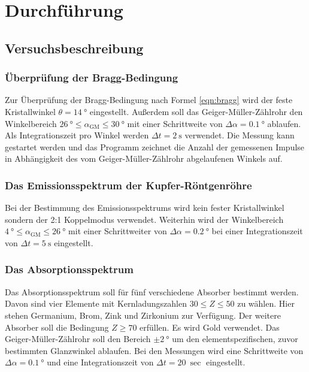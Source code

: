 \section{Durchführung}
\label{sec:Durchführung}



\FloatBarrier
\subsection{Versuchsbeschreibung}
\label{sec:Versuchsbeschreibung}

\subsubsection{Überprüfung der Bragg-Bedingung}
Zur Überprüfung der Bragg-Bedingung nach Formel \eqref{eqn:bragg} wird der feste Kristallwinkel
$\theta = \SI{14}{\degree}$ eingestellt. Außerdem soll das Geiger-Müller-Zählrohr den 
Winkelbereich $\SI{26}{\degree} \le \alpha_{\mathrm{GM}} \le \SI{30}{\degree}$ mit einer 
Schrittweite von $\Delta \alpha = \SI{0,1}{\degree}$ ablaufen. Als Integrationszeit pro
Winkel werden $\Delta t = \SI{2}{\second}$ verwendet.
Die Messung kann gestartet werden und das Programm zeichnet die Anzahl der gemessenen Impulse
in Abhängigkeit des vom Geiger-Müller-Zählrohr abgelaufenen Winkels auf.
\subsubsection{Das Emissionsspektrum der Kupfer-Röntgenröhre}
Bei der Bestimmung des Emissionsspektrums wird kein fester Kristallwinkel sondern der 
2:1 Koppelmodus verwendet.
Weiterhin wird der Winkelbereich $\SI{4}{\degree} \le \alpha_{\mathrm{GM}} \le \SI{26}{\degree}$
mit einer Schrittweiter von $\Delta \alpha = \SI{0,2}{\degree}$ bei einer Integrationszeit 
von $\Delta t = \SI{5}{\second}$ eingestellt.
\subsubsection{Das Absorptionsspektrum}
Das Absorptionsspektrum soll für fünf verschiedene Absorber bestimmt werden. Davon sind 
vier Elemente mit Kernladungszahlen $30 \le Z \le 50$ zu wählen. Hier stehen Germanium, 
Brom, Zink und Zirkonium zur Verfügung. Der weitere Absorber soll die Bedingung $Z \ge 70$
erfüllen. Es wird Gold verwendet.
Das Geiger-Müller-Zählrohr soll den Bereich $\pm \SI{2}{\degree}$ um den elementspezifischen,
zuvor bestimmten Glanzwinkel ablaufen.
Bei den Messungen wird eine Schrittweite von $\Delta \alpha = \SI{0,1}{\degree}$ und 
eine Integrationszeit von $\Delta t = \SI{20}{\sec}$ eingestellt.
